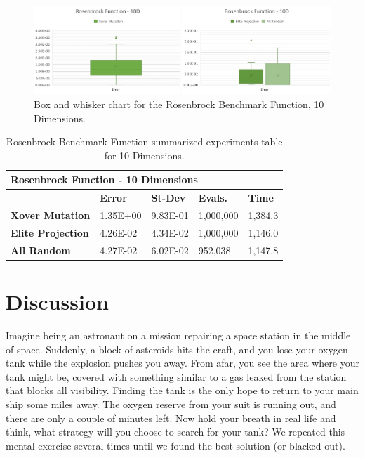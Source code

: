 \documentclass[graybox]{svmult}
\begin{document}
            \begin{figure}
                \includegraphics[width=0.99\linewidth, frame]{img/fig_fun_rosenbrock_10d.pdf}
                \caption{Box and whisker chart for the Rosenbrock Benchmark Function, 10 Dimensions.} \label{fig.fun_rosenbrock_10d}
                \end{figure}

            \begin{table}[]
                \scriptsize
                \centering
                \caption{Rosenbrock Benchmark Function summarized experiments table for 10 Dimensions.}\label{tab.fun_rosenbrock10}        
                \begin{tabular}{@{}lllll@{}}
                \toprule
                \multicolumn{5}{l}{\textbf{Rosenbrock Function - 10 Dimensions}} \\ \midrule
                & \textbf{Error} & \textbf{St-Dev} & \textbf{Evals.} & \textbf{Time} \\
                \textbf{Xover Mutation} & 1.35E+00 & 9.83E-01 & 1,000,000 & 1,384.3 \\
                \textbf{Elite Projection} & 4.26E-02 & 4.34E-02 & 1,000,000 & 1,146.0 \\
                \textbf{All Random} & 4.27E-02 & 6.02E-02 & 952,038 & 1,147.8 \\ \bottomrule
                \end{tabular}
                \end{table}
            
            \FloatBarrier

\section{Discussion}
    \label{section.discussion}

    Imagine being an astronaut on a mission repairing a space station in the
    middle of space. Suddenly, a block of asteroids hits the craft, and you
    lose your oxygen tank while the explosion pushes you away. From afar, you
    see the area where your tank might be, covered with something similar to a
    gas leaked from the station that blocks all visibility. Finding the tank is
    the only hope to return to your main ship some miles away. The oxygen
    reserve from your suit is running out, and there are only a couple of
    minutes left. Now hold your breath in real life and think, what strategy
    will you choose to search for your tank? We repeated this mental exercise
    several times until we found the best solution (or blacked out).
\end{document}
